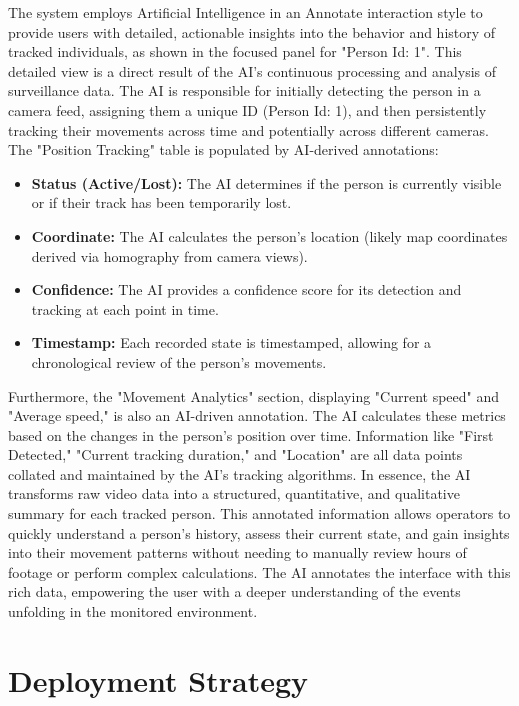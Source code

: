 The system employs Artificial Intelligence in an Annotate interaction style to provide users with detailed, actionable insights into the behavior and history of tracked individuals, as shown in the focused panel for "Person Id: 1". This detailed view is a direct result of the AI's continuous processing and analysis of surveillance data.
The AI is responsible for initially detecting the person in a camera feed, assigning them a unique ID (Person Id: 1), and then persistently tracking their movements across time and potentially across different cameras. The "Position Tracking" table is populated by AI-derived annotations:
\begin{itemize}
    \item   \textbf{Status (Active/Lost):} The AI determines if the person is currently visible or if their track has been temporarily lost.
    \item   \textbf{Coordinate:} The AI calculates the person's location (likely map coordinates derived via homography from camera views).
    \item   \textbf{Confidence:} The AI provides a confidence score for its detection and tracking at each point in time.
    \item   \textbf{Timestamp:} Each recorded state is timestamped, allowing for a chronological review of the person's movements. 
\end{itemize}
Furthermore, the "Movement Analytics" section, displaying "Current speed" and "Average speed," is also an AI-driven annotation. The AI calculates these metrics based on the changes in the person's position over time. Information like "First Detected," "Current tracking duration," and "Location" are all data points collated and maintained by the AI's tracking algorithms.
In essence, the AI transforms raw video data into a structured, quantitative, and qualitative summary for each tracked person. This annotated information allows operators to quickly understand a person's history, assess their current state, and gain insights into their movement patterns without needing to manually review hours of footage or perform complex calculations. The AI annotates the interface with this rich data, empowering the user with a deeper understanding of the events unfolding in the monitored environment.

\section{Deployment Strategy}
\label{section:deployment_aic} %

